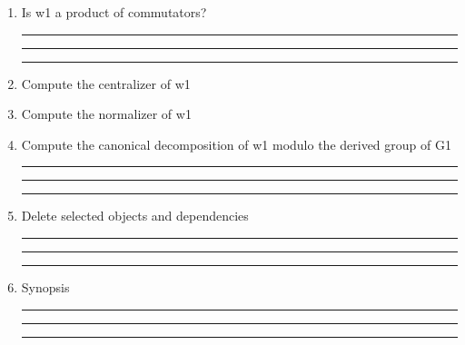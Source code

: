 \begin{enumerate}
\item Is w1 a product of commutators?


\bigskip
\hrule\hrule\hrule

\item Compute the centralizer of w1

\item Compute the normalizer of w1

\item Compute the canonical decomposition of w1 modulo the derived
group of G1

\bigskip
\hrule\hrule\hrule

\item Delete selected objects and dependencies

\bigskip
\hrule\hrule\hrule

\item
Synopsis

\bigskip
\hrule\hrule\hrule

\end{enumerate}
